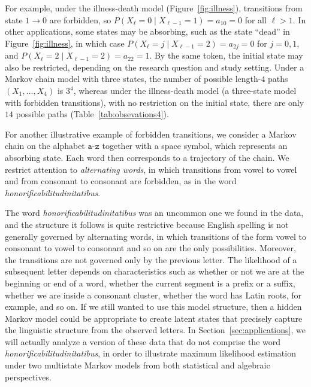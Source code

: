 \documentclass[11pt, a4paper]{article}
\numberwithin{equation}{section}
\theoremstyle{plain}
\theoremstyle{definition}
\renewcommand{\emph}[1]{\textit{#1}}
\begin{document}
For example, under the illness-death model (Figure~\ref{fig:illness}), transitions from state
$1 \rightarrow 0$ are forbidden, so $P(X_{\ell} = 0 \mid X_{\ell - 1} = 1) = a_{10} = 0$ for all
$\ell > 1$. In other applications, some states may be absorbing, such as the state ``dead'' in
Figure~\ref{fig:illness}, in which case $P(X_{\ell} = j \mid X_{\ell - 1} = 2) = a_{2j}=0$ for
$j=0,1$, and $P(X_{\ell} = 2 \mid X_{\ell - 1} = 2) = a_{22} = 1$. By the same token, the initial
state may also be restricted, depending on the research question and study setting.
Under a Markov chain model with three states, the number of possible length-$4$ paths
$(X_1,\dots,X_4)$ is $3^4$, whereas under the illness-death model (a three-state model with forbidden
transitions), with no restriction on the initial state, there are only $14$ possible paths
(Table~\ref{tab:obsevations4}).

For another illustrative example of forbidden transitions, we consider a Markov chain on the alphabet
$\texttt{a-z}$ together with a space symbol, which represents an absorbing state. Each word then
corresponds to a trajectory of the chain. We restrict attention to \emph{alternating words}, in which
transitions from vowel to vowel and from consonant to consonant are forbidden, as in the word
\emph{honorificabilitudinitatibus}.

The word \textit{honorificabilitudinitatibus} was an uncommon one we found in the data, and the structure it follows is quite restrictive  because English spelling is not generally governed by alternating words, in which transitions of the form vowel to consonant to vowel to consonant and so on are the only possibilities. Moreover, the transitions are not governed only by the previous letter. The likelihood of a subsequent letter depends on characteristics such as whether or not we are at the beginning or end of a word, whether the current segment is a prefix or a suffix, whether we are inside a consonant cluster, whether the word has Latin roots, for example, and so on. If we still wanted to use this model structure, then a hidden Markov model could be appropriate to create latent states that precisely capture the linguistic structure from the observed letters. In Section~\ref{sec:applications}, we will actually analyze a version of these data that do not comprise the word \emph{honorificabilitudinitatibus}, in order to illustrate maximum likelihood estimation under two multistate Markov models from both statistical and algebraic perspectives.
\end{document}
